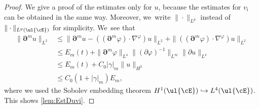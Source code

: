 \begin{proof}
We give a proof of the estimates only for $u$, because the estimates for $v_\mathrm{i}$ can be obtained in the same way.
Moreover, we~write $\|\cdot\|_{L^p}$ instead of $\|\cdot\|_{L^p(\ul{\cE})}$ for simplicity. We~see that
\begin{align*}
\|\bm{\partial}^m u\|_{L^2}
&\leq \|\bm{\partial}^m u - ((\bm{\partial}^m\varphi)\cdot\nabla^\varphi)u\|_{L^2}
+ \|((\bm{\partial}^m\varphi)\cdot\nabla^\varphi)u\|_{L^2} \\
&\leq E_m(t) + \|\bm{\partial}^m\varphi\|_{L^4} \|(\partial\varphi)^{-1}\|_{L^\infty} \|\partial u\|_{L^4} \\
&\leq E_m(t) + C_0|\gamma|_m \|u\|_{H^2} \\
&\leq C_0(1+|\gamma|_m)E_m,
\end{align*}
where we used the Sobolev embedding theorem $H^1(\ul{\cE}) \hookrightarrow L^4(\ul{\cE})$.
This shows \eqref{lem:EstDuvi}.


\end{proof}
